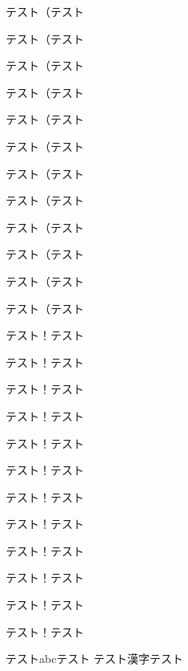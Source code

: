 \documentclass[twocolumn]{jarticle}
\begin{document}
テスト\linebreak（テスト\par    %
テスト\linebreak[4]（テスト\par %
テスト\linebreak[3]（テスト\par
テスト\linebreak[2]（テスト\par
テスト\linebreak[1]（テスト\par
テスト\linebreak[0]（テスト\par
テスト\nolinebreak（テスト\par
テスト\nolinebreak[4]（テスト\par
テスト\nolinebreak[3]（テスト\par
テスト\nolinebreak[2]（テスト\par
テスト\nolinebreak[1]（テスト\par
テスト\nolinebreak[0]（テスト\par
テスト\linebreak！テスト\par    %
テスト\linebreak[4]！テスト\par %
テスト\linebreak[3]！テスト\par
テスト\linebreak[2]！テスト\par
テスト\linebreak[1]！テスト\par
テスト\linebreak[0]！テスト\par
テスト\nolinebreak！テスト\par
テスト\nolinebreak[4]！テスト\par
テスト\nolinebreak[3]！テスト\par
テスト\nolinebreak[2]！テスト\par
テスト\nolinebreak[1]！テスト\par
テスト\nolinebreak[0]！テスト\par
テスト\nolinebreak abc\nolinebreak テスト
テスト\nolinebreak 漢字\nolinebreak テスト
\end{document}
